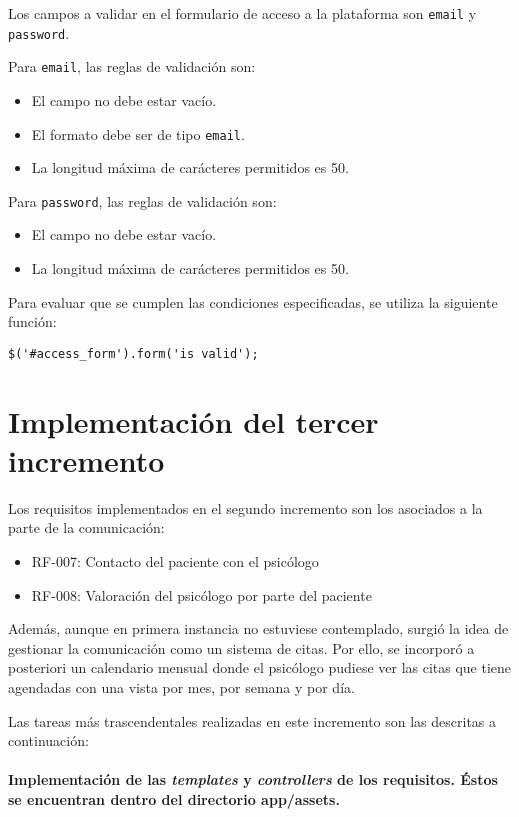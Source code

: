 Los campos a validar en el formulario de acceso a la plataforma son \texttt{email} y \texttt{password}.


Para \texttt{email}, las reglas de validación son:
\begin{itemize}
\item El campo no debe estar vacío.
\item El formato debe ser de tipo \texttt{email}.
\item La longitud máxima de carácteres permitidos es 50.
\end{itemize}


Para \texttt{password}, las reglas de validación son:
\begin{itemize}
\item El campo no debe estar vacío.
\item La longitud máxima de carácteres permitidos es 50.
\end{itemize}


Para evaluar que se cumplen las condiciones especificadas, se utiliza la siguiente función:


\medskip
\begin{lstlisting}
$('#access_form').form('is valid');
\end{lstlisting}


\section{Implementación del tercer incremento}
Los requisitos implementados en el segundo incremento son los asociados a la parte de la comunicación:


\begin{itemize}
\item RF-007: Contacto del paciente con el psicólogo
\item RF-008: Valoración del psicólogo por parte del paciente
\end{itemize}


Además, aunque en primera instancia no estuviese contemplado, surgió la idea de gestionar la comunicación como un sistema de citas. Por ello, se incorporó a posteriori un calendario mensual donde el psicólogo pudiese ver las citas que tiene agendadas con una vista por mes, por semana y por día.


Las tareas más trascendentales realizadas en este incremento son las descritas a continuación:


\paragraph*{Implementación de las \textit{templates} y \textit{controllers} de los requisitos. Éstos se encuentran dentro del directorio app/assets.}


